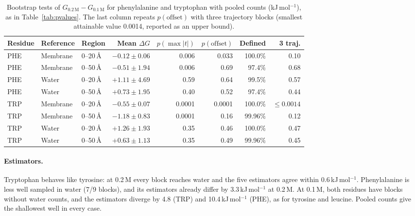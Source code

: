 \documentclass[11pt,a4paper]{article}
\newcommand{\kJ}{\,kJ\,mol$^{-1}$}
\begin{document}
\begin{table}[H]
\centering
\caption{Bootstrap tests of $G_{0.2\,\text{M}} - G_{0.1\,\text{M}}$ for phenylalanine and
tryptophan with pooled counts (kJ\,mol$^{-1}$), as in Table~\ref{tab:pvalues}. The last column
repeats $p(\text{offset})$ with three trajectory blocks (smallest attainable value 0.0014,
reported as an upper bound).}
\label{tab:phe_trp_pvalues}
\small
\setlength{\tabcolsep}{5pt}
\begin{tabular}{lllrrrrr}
\toprule
Residue & Reference & Region & Mean $\Delta G$ & $p(\max|t|)$ & $p(\text{offset})$ & Defined & 3 traj. \\
\midrule
PHE & Membrane & 0--20\,\AA & $-0.12 \pm 0.06$ & 0.006 & 0.033 & 100.0\% & 0.10 \\
PHE & Membrane & 0--50\,\AA & $-0.51 \pm 1.94$ & 0.006 & 0.69  & 97.4\%  & 0.68 \\
PHE & Water    & 0--20\,\AA & $+1.11 \pm 4.69$ & 0.59  & 0.64  & 99.5\%  & 0.57 \\
PHE & Water    & 0--50\,\AA & $+0.73 \pm 1.95$ & 0.40  & 0.52  & 97.4\%  & 0.44 \\
\midrule
TRP & Membrane & 0--20\,\AA & $-0.55 \pm 0.07$ & 0.0001 & 0.0001 & 100.0\% & $\le 0.0014$ \\
TRP & Membrane & 0--50\,\AA & $-1.18 \pm 0.83$ & 0.0001 & 0.16   & 99.96\% & 0.12 \\
TRP & Water    & 0--20\,\AA & $+1.26 \pm 1.93$ & 0.35   & 0.46   & 100.0\% & 0.47 \\
TRP & Water    & 0--50\,\AA & $+0.63 \pm 1.13$ & 0.35   & 0.49   & 99.96\% & 0.45 \\
\bottomrule
\end{tabular}
\end{table}

\paragraph{Estimators.} Tryptophan behaves like tyrosine: at 0.2\,M every block reaches water
and the five estimators agree within 0.6\kJ. Phenylalanine is less well sampled in water
(7/9 blocks), and its estimators already differ by 3.3\kJ{} at 0.2\,M. At 0.1\,M, both
residues have blocks without water counts, and the estimators diverge by 4.8 (TRP) and
10.4\kJ{} (PHE), as for tyrosine and leucine. Pooled counts give the shallowest well in every
case.
\end{document}
